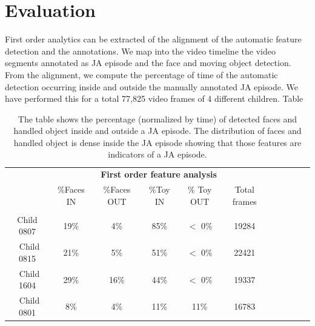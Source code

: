 \documentclass[10pt,letterpaper]{article}
\begin{document}
\section{Evaluation}
First order analytics can be extracted of the alignment of the automatic feature detection and the annotations. We map into the video timeline the video segments annotated as JA episode and the face and moving object detection. From the alignment, we compute the percentage of time of the automatic detection occurring inside and outside the manually annotated JA episode. We have performed this for a total 77,825 video frames of 4 different children.  Table 

\begin{table}
\centering
\begin{tabular}{|c|c|c|c|c|c|c|c|c|c|c|}
\cline{2-6}
\multicolumn{1}{c}{} & \multicolumn{5}{c}{{\bf First order feature analysis}} 
\\
\cline{2-6}
\multicolumn{1}{c|}{} &\%Faces IN & \%Faces OUT & \%Toy IN & \% Toy OUT & Total frames\\
\hline\\[-1.2em]\hline
Child 0807 &  19\%        & 4\%    &  85\%  &  $<$ 0\%& 19284\\
\hline\
Child 0815 &   21\%       & 5\%    &  51\%   &$<$ 0\%& 22421\\
\hline\
Child 1604 &   29\%       & 16\%  &  44\%   & $<$ 0\%  & 19337\\
\hline\
Child 0801 &   8\%         &  4\%   &  11\%   & 11\%  & 16783\\
\hline
\end{tabular}
\caption{The table shows the percentage (normalized by time) of detected faces and handled object inside and outside a JA episode. The distribution of faces and handled object is dense inside the JA episode showing that those features are indicators of a JA episode.}
\label{tb:Results2}
\end{table}
\end{document}
